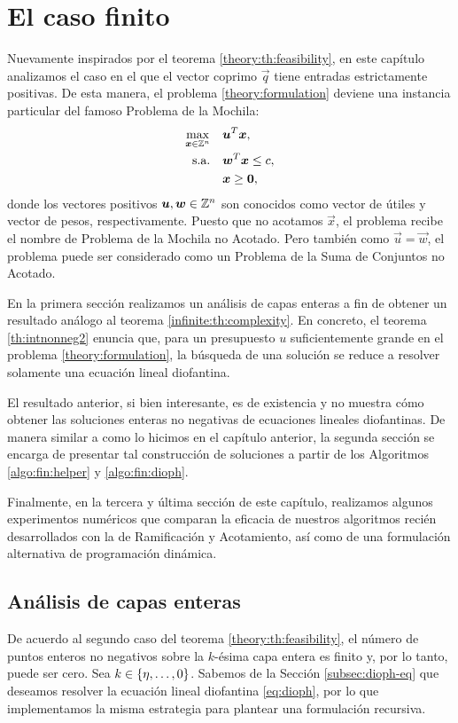 \chapter{El caso finito}
\noindent
Nuevamente inspirados por el teorema \ref{theory:th:feasibility}, en este capítulo analizamos el
caso en el que el vector coprimo $\vec{q}$ tiene entradas estrictamente positivas. De esta manera,
el problema \eqref{theory:formulation} deviene una instancia particular del famoso Problema de la
Mochila:
\begin{subequations}
	\label{knapsack-formulation}
	\begin{align}
		\max_{\boldsymbol{x} \in \mathbb{Z}^n} \quad
			& \boldsymbol{u}^T\boldsymbol{x}, \\
		\text{s.a.} \quad
			& \boldsymbol{w}^T\boldsymbol{x} \leq c, \\
			& \boldsymbol{x} \geq \boldsymbol{0},
	\end{align}
\end{subequations}
donde los vectores positivos $\boldsymbol{u}, \boldsymbol{w} \in \mathbb{Z}^n$ son conocidos como vector de útiles y
vector de pesos, respectivamente. Puesto que no acotamos $\vec{x}$, el problema recibe el nombre de
Problema de la Mochila no Acotado. Pero también como $\vec{u} = \vec{w}$, el problema puede
ser considerado como un Problema de la Suma de Conjuntos no Acotado.

En la primera sección realizamos un análisis de capas enteras a fin de obtener un resultado análogo
al teorema \ref{infinite:th:complexity}. En concreto, el teorema \ref{th:intnonneg2} enuncia que,
para un presupuesto $u$ suficientemente grande en el problema \eqref{theory:formulation}, la
búsqueda de una solución se reduce a resolver solamente una ecuación lineal diofantina.

El resultado anterior, si bien interesante, es de existencia y no muestra cómo obtener las
soluciones enteras no negativas de ecuaciones lineales diofantinas. De manera similar a como lo
hicimos en el capítulo anterior, la segunda sección se encarga de presentar tal construcción de
soluciones a partir de los Algoritmos \ref{algo:fin:helper} y \ref{algo:fin:dioph}.

Finalmente, en la tercera y última sección de este capítulo, realizamos algunos experimentos
numéricos que comparan la eficacia de nuestros algoritmos recién desarrollados con la de
Ramificación y Acotamiento, así como de una formulación alternativa de programación dinámica.

\section{Análisis de capas enteras}
\noindent
De acuerdo al segundo caso del teorema \ref{theory:th:feasibility}, el número de puntos enteros no
negativos sobre la $k$-ésima capa entera es finito y, por lo tanto, puede ser cero. Sea $k \in
\lbrace \eta, \ldots, 0 \rbrace$. Sabemos de la Sección \ref{subsec:dioph-eq} que deseamos resolver la
ecuación lineal diofantina \eqref{eq:dioph}, por lo que implementamos la misma estrategia para
plantear una formulación recursiva. 

